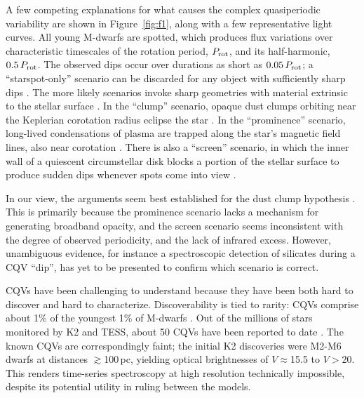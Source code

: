 \documentclass[11pt,twocolumn,tighten]{aastex63}
\begin{document}
A few competing explanations for what causes the complex quasiperiodic
variability are shown in Figure~\ref{fig:f1}, along with a few
representative light curves.  All young M-dwarfs are spotted, which
produces flux variations over characteristic timescales of the
rotation period, $P_{\rm rot}$, and its half-harmonic, $0.5\,P_{\rm
rot}$.  The observed dips occur over durations as short as
$0.05\,P_{\rm rot}$; a ``starspot-only'' scenario can be discarded for
any object with sufficiently sharp dips
\citep{2017AJ....153..152S,2021MNRAS.500.1366K}.   The more likely
scenarios invoke sharp geometries with material extrinsic to the
stellar surface
\citep[e.g.][]{2017AJ....153..152S,2022AJ....163..144G}.  In the
``clump'' scenario, opaque dust clumps orbiting near the Keplerian
corotation radius eclipse the star
\citep{2017AJ....153..152S,2023MNRAS.518.4734S}.  In the
``prominence'' scenario, long-lived condensations of plasma are
trapped along the star’s magnetic field lines, also near corotation
\citep{2022MNRAS.514.5465W}.  There is also a ``screen'' scenario, in
which the inner wall of a quiescent circumstellar disk blocks a
portion of the stellar surface to produce sudden dips whenever spots
come into view \citep{2019ApJ...876..127Z}.  

In our view, the arguments seem best established for the dust clump
hypothesis \citep{2023MNRAS.518.4734S}.  This is primarily because the
prominence scenario lacks a mechanism for generating broadband
opacity, and the screen scenario seems inconsistent with the degree of
observed periodicity, and the lack of infrared excess.  However,
unambiguous evidence, for instance a spectroscopic detection of
silicates during a CQV ``dip'', has yet to be presented to confirm
which scenario is correct.

CQVs have been challenging to understand because they have been both
hard to discover and hard to characterize.   Discoverability is tied
to rarity: CQVs comprise about 1\% of the youngest 1\% of M-dwarfs
\citep{2018AJ....155..196R}.  Out of the millions of stars monitored
by K2 and TESS, about 50 CQVs have been reported to date
\citep{2016AJ....152..114R,2017AJ....153..152S,2018AJ....155...63S,2019ApJ...876..127Z,2020AJ....160...86B,2022AJ....163..144G,2023ApJ...945..114P}.
The known CQVs are correspondingly faint; the initial K2 discoveries
\citep{2016AJ....152..114R,2017AJ....153..152S} were M2-M6 dwarfs at
distances $\gtrsim$100\,pc, yielding optical brightnesses of
$V$$\approx$15.5 to $V$$>$20.  This renders time-series spectroscopy
at high resolution technically impossible, despite its potential
utility in ruling between the models.
\end{document}
